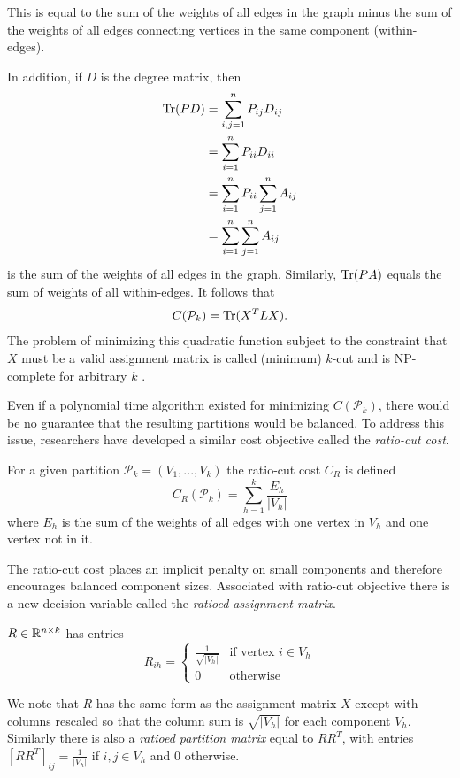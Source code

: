 This is equal to the sum of the weights of all edges in the graph minus
the sum of the weights of all edges connecting vertices in the same
component (within-edges).

In addition, if $D$ is the degree matrix, then
\begin{align*}
\operatorname{Tr}(P D) &= \sum_{i,j = 1}^n P_{ij} D_{ij} \\
         &= \sum_{i=1}^n P_{ii} D_{ii}  \\
         &= \sum_{i=1}^n P_{ii} \sum_{j=1}^n A_{ij} \\
         &= \sum_{i=1}^n \sum_{j=1}^n A_{ij}
\end{align*}
is the sum of the weights of all edges in the graph.
Similarly, $\operatorname{Tr}(P A)$ equals the sum of weights of all within-edges.
It follows that 
\[ C(\mathcal{P}_k) = \operatorname{Tr}(X^T L X). \]
The problem of minimizing this quadratic function subject to the
constraint that $X$ must be a valid assignment matrix is called
(minimum) $k$-cut and is NP-complete for arbitrary $k$
\cite{Goldschmidt:94}.

Even if a polynomial time algorithm existed for minimizing
$C(\mathcal{P}_k)$, there would be no guarantee that the resulting
partitions would be balanced. To address this issue, researchers have
developed a similar cost objective called the \textit{ratio-cut cost}.

\begin{definition}
 For a given partition
$\mathcal{P}_k = (V_1, ..., V_k)$ the ratio-cut cost $C_R$ is defined
\[ C_R(\mathcal{P}_k) = \sum_{h=1}^k \frac{E_h}{|V_h|} \]
where $E_h$ is the sum of the weights of all edges with one vertex in
$V_h$ and one vertex not in it.
\end{definition}

The ratio-cut cost places an implicit penalty on small components
and therefore encourages balanced component sizes. Associated with
ratio-cut objective there is a new decision variable called the
\textit{ratioed assignment matrix}.

\begin{definition}
 $R \in \mathbb{R}^{n \times k}$ has entries
\[ R_{ih} = \begin{cases}
		\frac{1}{\sqrt{|V_h|}} & \mbox{if vertex } i \in V_h \\
		0 & \mbox{otherwise}
\end{cases} \]
\end{definition}

We note that $R$ has the same form as the assignment matrix $X$
except with columns rescaled so that the column sum is $\sqrt{|V_h|}$
for each component $V_h$. Similarly there is also a
\textit{ratioed partition matrix} equal to $R R^T$, with entries
$[R R^T]_{ij} = \frac{1}{|V_h|}$ if $i,j \in V_h$ and 0 otherwise.

